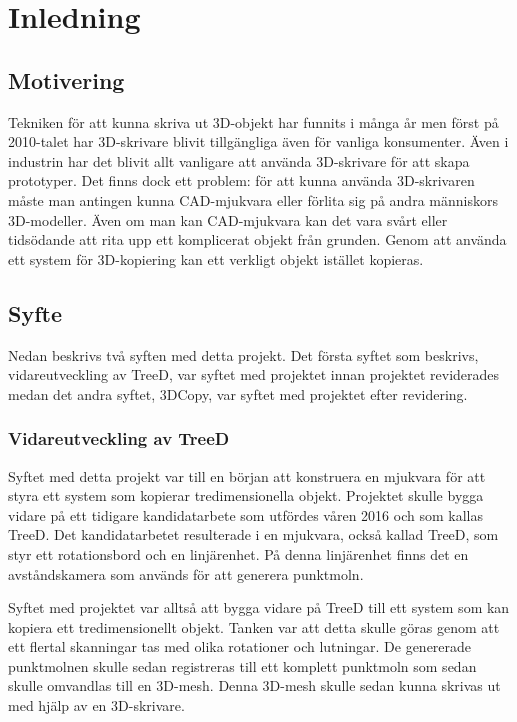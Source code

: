\chapter{Inledning}
\label{cha:introduction}
 
\section{Motivering}
\label{sec:motivation}
Tekniken för att kunna skriva ut 3D-objekt har funnits i många år men först på 2010-talet har 3D-skrivare blivit tillgängliga även för vanliga konsumenter. Även i industrin har det blivit allt vanligare att använda 3D-skrivare för att skapa prototyper. Det finns dock ett problem: för att kunna använda 3D-skrivaren måste man antingen kunna CAD-mjukvara eller förlita sig på andra människors 3D-modeller. Även om man kan CAD-mjukvara kan det vara svårt eller tidsödande att rita upp ett komplicerat objekt från grunden. Genom att använda ett system för 3D-kopiering kan ett verkligt objekt istället kopieras.


\section{Syfte}
\label{sec:aim}

Nedan beskrivs två syften med detta projekt. Det första syftet som beskrivs, vidareutveckling av TreeD, var syftet med projektet innan projektet reviderades medan det andra syftet, 3DCopy, var syftet med projektet efter revidering.

\subsection{Vidareutveckling av TreeD}
Syftet med detta projekt var till en början att konstruera en mjukvara för att styra ett system som kopierar tredimensionella objekt. Projektet skulle bygga vidare på ett tidigare kandidatarbete som utfördes våren 2016 och som kallas TreeD. Det kandidatarbetet resulterade i en mjukvara, också kallad TreeD, som styr ett rotationsbord och en linjärenhet. På denna linjärenhet finns det en avståndskamera som används för att generera punktmoln. 

Syftet med projektet var alltså att bygga vidare på TreeD till ett system som kan kopiera ett tredimensionellt objekt. Tanken var att detta skulle göras genom att ett flertal skanningar tas med olika rotationer och lutningar. De genererade punktmolnen skulle sedan registreras till ett komplett punktmoln som sedan skulle omvandlas till en 3D-mesh. Denna 3D-mesh skulle sedan kunna skrivas ut med hjälp av en 3D-skrivare.

